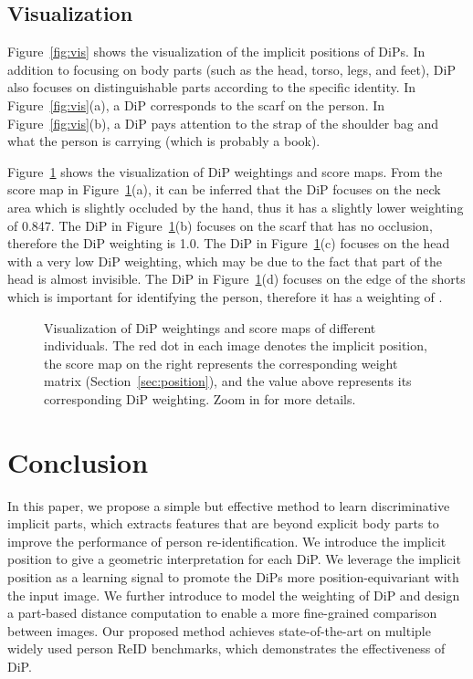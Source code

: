 \documentclass[10pt,twocolumn,letterpaper]{article}
\begin{document}
\subsection{Visualization}
\label{sec:vis}
Figure~\ref{fig:vis} shows the visualization of the implicit positions of DiPs. In addition to focusing on body parts (such as the head, torso, legs, and feet), DiP also focuses on distinguishable parts according to the specific identity. In Figure~\ref{fig:vis}(a), a DiP corresponds to the scarf on the person. In Figure~\ref{fig:vis}(b), a DiP pays attention to the strap of the shoulder bag and what the person is carrying (which is probably a book).

Figure~\ref{fig:dipvis} shows the visualization of DiP weightings and score maps. 
From the score map in Figure~\ref{fig:dipvis}(a), it can be inferred that the DiP focuses on the neck area which is slightly occluded by the hand, thus it has a slightly lower weighting of 0.847.
The DiP in Figure~\ref{fig:dipvis}(b) focuses on the scarf that has no occlusion, therefore the DiP weighting is 1.0. The DiP in Figure~\ref{fig:dipvis}(c) focuses on the head with a very low DiP weighting, which may be due to the fact that part of the head is almost invisible. The DiP in Figure~\ref{fig:dipvis}(d) focuses on the edge of the shorts which is important for identifying the person, therefore it has a weighting of .


\begin{figure}
\setlength{\abovecaptionskip}{0.1cm}
\setlength{\belowcaptionskip}{-0.5cm}
\centering
{} 

\caption{Visualization of DiP weightings and score maps of different individuals. The red dot in each image denotes the implicit position, the score map on the right represents the corresponding weight matrix  (Section~\ref{sec:position}), and the value above represents its corresponding DiP weighting. Zoom in for more details.}
\label{fig:dipvis}
\end{figure}


\section{Conclusion}
\label{sec:conclusion}
In this paper, we propose a simple but effective method to learn discriminative implicit parts, which extracts features that are beyond explicit body parts to improve the performance of person re-identification. We introduce the implicit position to give a geometric interpretation for each DiP. We leverage the implicit position as a learning signal to promote the DiPs more position-equivariant with the input image. We further introduce to model the weighting of DiP and design a part-based distance computation to enable a more fine-grained comparison between images.
Our proposed method achieves state-of-the-art on multiple widely used person ReID benchmarks, which demonstrates the effectiveness of DiP.


\normalem
{\small


}
\end{document}
